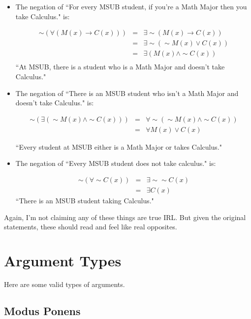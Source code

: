 \begin{itemize}
\item The negation of ``For every MSUB student, if you're a Math Major then you take Calculus." is:

\begin{eqnarray*}
\sim(\forall (M(x)\to C(x)))&=&\exists\sim (M(x)\to C(x))\\
&=&\exists\sim (\sim M(x)\vee C(x))\\
&=&\exists(M(x)\wedge \sim C(x))\\
\end{eqnarray*}
``At MSUB, there is a student who is a Math Major and doesn't take Calculus."

\item The negation of ``There is an MSUB student who isn't a Math Major and doesn't take Calculus." is:

\begin{eqnarray*}
\sim(\exists (\sim M(x)\wedge \sim C(x)))&=&\forall \sim(\sim M(x)\wedge \sim C(x))\\
&=&\forall M(x)\vee C(x)
\end{eqnarray*}

``Every student at MSUB either is a Math Major or takes Calculus."

\item The negation of ``Every MSUB student does not take calculus." is:

\begin{eqnarray*}
\sim(\forall \sim C(x))&=&\exists \sim\sim C(x)\\
&=&\exists C(x)
\end{eqnarray*}
``There is an MSUB student taking Calculus."






\end{itemize}
Again, I'm not claiming any of these things are true IRL.  But given the original statements, these should read and feel like real opposites.



\section{Argument Types}\label{Section:Arguments}

Here are some valid types of arguments.

\subsection{Modus Ponens}

